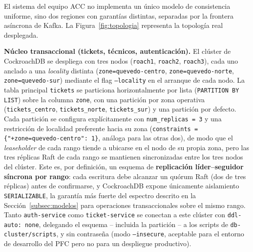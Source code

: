\documentclass[11pt,a4paper]{article}
\begin{document}
El sistema del equipo ACC no implementa un \'unico modelo de consistencia uniforme, sino dos
regiones con garant\'ias distintas, separadas por la frontera as\'incrona de Kafka. La
Figura~\ref{fig:topologia} representa la topolog\'ia real desplegada.

\textbf{N\'ucleo transaccional (tickets, t\'ecnicos, autenticaci\'on).} El cl\'uster de CockroachDB
se despliega con tres nodos (\texttt{roach1}, \texttt{roach2}, \texttt{roach3}), cada uno anclado a
una \emph{locality} distinta (\texttt{zone=quevedo-centro}, \texttt{zone=quevedo-norte},
\texttt{zone=quevedo-sur}) mediante el flag \texttt{--locality} en el arranque de cada nodo. La
tabla principal \texttt{tickets} se particiona horizontalmente por lista (\texttt{PARTITION BY
LIST}) sobre la columna \texttt{zone}, con una partici\'on por zona operativa
(\texttt{tickets\_centro}, \texttt{tickets\_norte}, \texttt{tickets\_sur}) y una partici\'on por
defecto. Cada partici\'on se configura expl\'icitamente con \texttt{num\_replicas = 3} y una
restricci\'on de localidad preferente hacia su zona (\texttt{constraints =
\{"+zone=quevedo-centro": 1\}}, an\'aloga para las otras dos), de modo que el \emph{leaseholder}
de cada rango tiende a ubicarse en el nodo de su propia zona, pero las tres r\'eplicas Raft de cada
rango se mantienen sincronizadas entre los tres nodos del cl\'uster. Este es, por definici\'on,
un esquema de \textbf{replicaci\'on l\'ider--seguidor s\'incrona por rango}: cada escritura debe
alcanzar un qu\'orum Raft (dos de tres r\'eplicas) antes de confirmarse, y CockroachDB expone
\'unicamente aislamiento \texttt{SERIALIZABLE}, la garant\'ia m\'as fuerte del espectro descrito en
la Secci\'on~\ref{subsec:modelos} para operaciones transaccionales sobre el mismo rango. Tanto
\texttt{auth-service} como \texttt{ticket-service} se conectan a este cl\'uster con
\texttt{ddl-auto: none}, delegando el esquema -- incluida la partici\'on -- a los scripts de
\texttt{db-cluster/scripts}, y sin contrase\~na (modo \texttt{--insecure}, aceptable para el
entorno de desarrollo del PFC pero no para un despliegue productivo).
\end{document}
